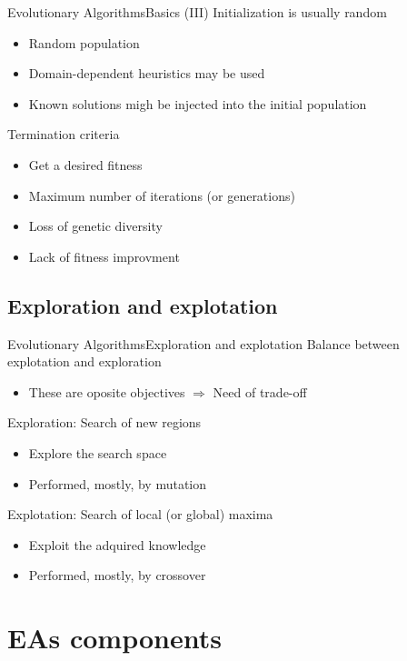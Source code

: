 \documentclass[10pt,compress]{beamer} %
\begin{document}
\begin{frame}{Evolutionary Algorithms}{Basics (III)}
	Initialization is usually random
	\begin{itemize}
		\item Random population
		\item Domain-dependent heuristics may be used
		\item Known solutions migh be injected into the initial population
	\end{itemize}
	Termination criteria
	\begin{itemize}
		\item Get a desired fitness
		\item Maximum number of iterations (or generations)
		\item Loss of genetic diversity
		\item Lack of fitness improvment
	\end{itemize}
\end{frame}

\subsection{Exploration and explotation}
\begin{frame}{Evolutionary Algorithms}{Exploration and explotation} 
	Balance between \alert{explotation} and \alert{exploration}
        \begin{itemize}
	    \item These are oposite objectives $\Rightarrow$ Need of trade-off
        \end{itemize}
	Exploration: Search of new regions%
		\begin{itemize}
		\item Explore the search space
		\item Performed, mostly, by mutation
		\end{itemize}
	Explotation: Search of local (or global) maxima%
		\begin{itemize}
		\item Exploit the adquired knowledge
		\item Performed, mostly, by crossover
		\end{itemize}
\end{frame}

\section{EAs components}
\end{document}
